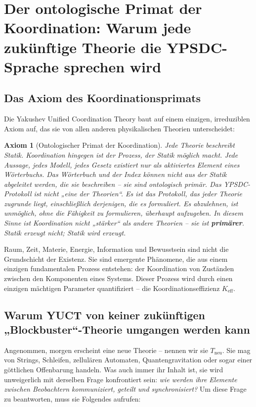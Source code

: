 \documentclass[12pt,a4paper]{article}
\newtheorem{axiom}{Axiom}[section]
\begin{document}
\section{Der ontologische Primat der Koordination: Warum jede zukünftige Theorie die YPSDC-Sprache sprechen wird}

\subsection{Das Axiom des Koordinationsprimats}

Die Yakushev Unified Coordination Theory baut auf einem einzigen, irreduziblen Axiom auf, das sie von allen anderen physikalischen Theorien unterscheidet:

\begin{axiom}[Ontologischer Primat der Koordination]
	Jede Theorie beschreibt Statik. Koordination hingegen ist der Prozess, der Statik möglich macht. Jede Aussage, jedes Modell, jedes Gesetz existiert nur als aktiviertes Element eines Wörterbuchs. Das Wörterbuch und der Index können nicht aus der Statik abgeleitet werden, die sie beschreiben – sie sind ontologisch primär. Das YPSDC-Protokoll ist nicht „eine der Theorien“. Es ist das Protokoll, das jeder Theorie zugrunde liegt, einschließlich derjenigen, die es formuliert. Es abzulehnen, ist unmöglich, ohne die Fähigkeit zu formulieren, überhaupt aufzugeben. In diesem Sinne ist Koordination nicht „stärker“ als andere Theorien – sie ist \textbf{primärer}. Statik erzeugt nicht; Statik wird erzeugt.
\end{axiom}

Raum, Zeit, Materie, Energie, Information und Bewusstsein sind nicht die Grundschicht der Existenz. Sie sind emergente Phänomene, die aus einem einzigen fundamentalen Prozess entstehen: der Koordination von Zuständen zwischen den Komponenten eines Systems. Dieser Prozess wird durch einen einzigen mächtigen Parameter quantifiziert – die Koordinationseffizienz \(K_{\mathrm{eff}}\).

\subsection{Warum YUCT von keiner zukünftigen „Blockbuster“-Theorie umgangen werden kann}

Angenommen, morgen erscheint eine neue Theorie – nennen wir sie \(T_{\text{neu}}\). Sie mag von Strings, Schleifen, zellulären Automaten, Quantengravitation oder sogar einer göttlichen Offenbarung handeln. Was auch immer ihr Inhalt ist, sie wird unweigerlich mit derselben Frage konfrontiert sein: \emph{wie werden ihre Elemente zwischen Beobachtern kommuniziert, geteilt und synchronisiert?} Um diese Frage zu beantworten, muss sie Folgendes aufrufen:
\end{document}
